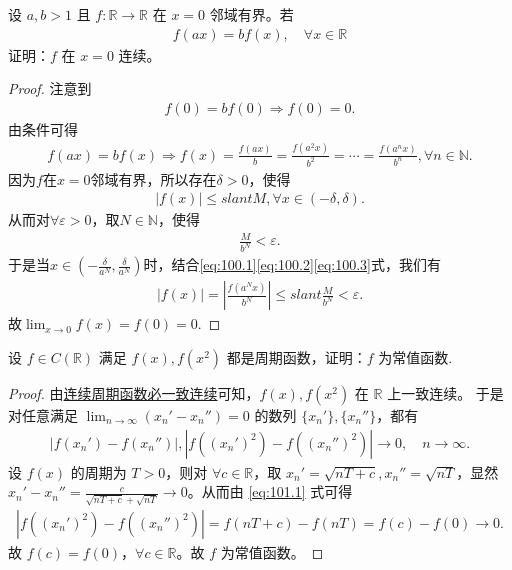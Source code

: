 \documentclass[../../main.tex]{subfiles}
\begin{document}
\begin{example}
设 \(a,b > 1\) 且 \(f: \mathbb{R} \to \mathbb{R}\) 在 \(x = 0\) 邻域有界。若
\begin{align*}
f(ax) = bf(x),\quad \forall x \in \mathbb{R}
\end{align*}
证明：\(f\) 在 \(x = 0\) 连续。 
\end{example}
\begin{proof}
注意到
\begin{align*}
f(0) = bf(0) \Rightarrow f(0) = 0.
\end{align*}
由条件可得
\begin{align}
f(ax) = bf(x) \Rightarrow f(x) = \frac{f(ax)}{b} = \frac{f(a^2x)}{b^2} = \cdots = \frac{f(a^nx)}{b^n}, \forall n \in \mathbb{N}. \label{eq:100.1}
\end{align}
因为\(f\)在\(x=0\)邻域有界，所以存在\(\delta > 0\)，使得
\begin{align}
|f(x)| \leqslant slant M, \forall x \in (-\delta, \delta). \label{eq:100.2}
\end{align}
从而对\(\forall \varepsilon > 0\)，取\(N \in \mathbb{N}\)，使得
\begin{align}
\frac{M}{b^N} < \varepsilon. \label{eq:100.3}
\end{align}
于是当\(x \in \left( -\frac{\delta}{a^N}, \frac{\delta}{a^N} \right)\)时，结合\eqref{eq:100.1}\eqref{eq:100.2}\eqref{eq:100.3}式，我们有
\begin{align*}
|f(x)| = \left| \frac{f(a^Nx)}{b^N} \right| \leqslant slant \frac{M}{b^N} < \varepsilon.
\end{align*}
故\(\lim_{x \to 0} f(x) = f(0) = 0.\)
\end{proof}

\begin{example}
设 \(f \in C(\mathbb{R})\) 满足 \(f(x), f(x^2)\) 都是周期函数，证明：\(f\) 为常值函数. 
\end{example}
\begin{proof}
由\hyperref[proposition:连续周期函数必一致连续]{连续周期函数必一致连续}可知，\(f(x),f(x^2)\) 在 \(\mathbb{R}\) 上一致连续。
于是对任意满足 \(\lim_{n \to \infty} (x_n' - x_n'') = 0\) 的数列 \(\{x_n'\}, \{x_n''\}\)，都有
\begin{align}
|f(x_n') - f(x_n'')|, |f((x_n')^2) - f((x_n'')^2)| \to 0, \quad n \to \infty. \label{eq:101.1}
\end{align}
设 \(f(x)\) 的周期为 \(T > 0\)，则对 \(\forall c \in \mathbb{R}\)，取 \(x_n' = \sqrt{nT + c}, x_n'' = \sqrt{nT}\)，显然 \(x_n' - x_n'' = \frac{c}{\sqrt{nT + c} + \sqrt{nT}} \to 0\)。从而由 \eqref{eq:101.1} 式可得
\begin{align*}
|f((x_n')^2) - f((x_n'')^2)| = f(nT + c) - f(nT) = f(c) - f(0) \to 0.
\end{align*}
故 \(f(c) = f(0)\)，\(\forall c \in \mathbb{R}\)。故 \(f\) 为常值函数。
\end{proof}
\end{document}
